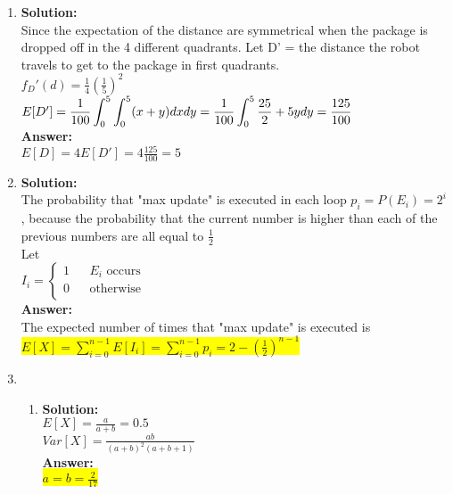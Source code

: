 \documentclass{article}
\newcommand{\myansw}{\textbf{Answer:}\\}
\newcommand{\mysolu}{\textbf{Solution:}\\}
\begin{document}
\begin{enumerate}
\begin{enumerate}
	\end{enumerate}
	\item
	\mysolu
	Since the expectation of the distance are symmetrical when the package is dropped off in the 4 different quadrants. Let D' = the distance the robot travels to get to the package in first quadrants.\\
	${f_D'(d) = \frac{1}{4}(\frac{1}{5})^2}$\\
	${E[D']=\mathlarger{\frac{1}{100}\int_{0}^{5} \int_{0}^{5} (x+y) dxdy=\frac{1}{100}\int_{0}^{5} \frac{25}{2}+5ydy=\frac{125}{100}}}$\\
	\myansw
	${E[D] = 4E[D'] = 4 \frac{125}{100} = 5}$\\
	\item
	\mysolu
	The probability that "max update" is executed in each loop ${p_i =P(E_i)= 2^i}$, because the probability that the current number is higher than each of the previous numbers are all equal to ${\frac{1}{2}}$\\
	Let\\
	${I_i = \left\lbrace \begin{array}{rcl}1 & & E_i \text{ occurs}\\
		0 & &  \text{otherwise}\\
		\end{array}\right.}$\\
	\myansw
	The expected number of times that "max update" is executed is\\
	\colorbox{yellow}{${E[X] = \sum\limits_{i = 0}^{n-1}E[I_i] = \sum\limits_{i = 0}^{n-1}p_i = 2 - (\frac{1}{2})^{n-1}}$}
	
	\item
	\begin{enumerate}
		\item
		\mysolu
		${E[X] = \frac{a}{a+b} = 0.5}$\\
		${Var[X] =\frac{ab}{(a+b)^2(a+b+1)}}$\\
		\myansw
		\colorbox{yellow}{${a = b = \frac{2}{17}}$}\\
	\end{enumerate}
	
	
	
	
	
\end{enumerate}


\newpage
\end{document}
